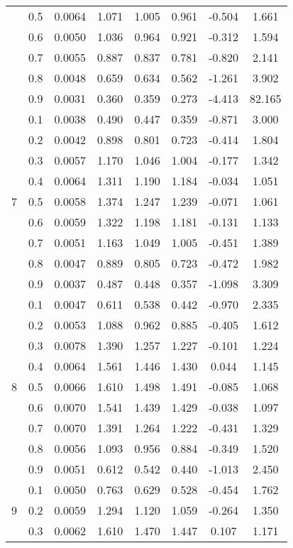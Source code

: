 \documentclass[11pt,a4paper]{report}
\begin{document}
\begin{longtable}{ | c | c || c | c | c | c | c | c | }
 & 0.5 & 0.0064 & 1.071 & 1.005 & 0.961 & -0.504 & 1.661 \\
 & 0.6 & 0.0050 & 1.036 & 0.964 & 0.921 & -0.312 & 1.594 \\
 & 0.7 & 0.0055 & 0.887 & 0.837 & 0.781 & -0.820 & 2.141 \\
 & 0.8 & 0.0048 & 0.659 & 0.634 & 0.562 & -1.261 & 3.902 \\
 & 0.9 & 0.0031 & 0.360 & 0.359 & 0.273 & -4.413 & 82.165 \\
 \hline
\multirow{9}{*}{7} & 0.1 & 0.0038 & 0.490 & 0.447 & 0.359 & -0.871 & 3.000 \\
 & 0.2 & 0.0042 & 0.898 & 0.801 & 0.723 & -0.414 & 1.804 \\
 & 0.3 & 0.0057 & 1.170 & 1.046 & 1.004 & -0.177 & 1.342 \\
 & 0.4 & 0.0064 & 1.311 & 1.190 & 1.184 & -0.034 & 1.051 \\
 & 0.5 & 0.0058 & 1.374 & 1.247 & 1.239 & -0.071 & 1.061 \\
 & 0.6 & 0.0059 & 1.322 & 1.198 & 1.181 & -0.131 & 1.133 \\
 & 0.7 & 0.0051 & 1.163 & 1.049 & 1.005 & -0.451 & 1.389 \\
 & 0.8 & 0.0047 & 0.889 & 0.805 & 0.723 & -0.472 & 1.982 \\
 & 0.9 & 0.0037 & 0.487 & 0.448 & 0.357 & -1.098 & 3.309 \\
 \hline
\multirow{9}{*}{8} & 0.1 & 0.0047 & 0.611 & 0.538 & 0.442 & -0.970 & 2.335 \\
 & 0.2 & 0.0053 & 1.088 & 0.962 & 0.885 & -0.405 & 1.612 \\
 & 0.3 & 0.0078 & 1.390 & 1.257 & 1.227 & -0.101 & 1.224 \\
 & 0.4 & 0.0064 & 1.561 & 1.446 & 1.430 & 0.044 & 1.145 \\
 & 0.5 & 0.0066 & 1.610 & 1.498 & 1.491 & -0.085 & 1.068 \\
 & 0.6 & 0.0070 & 1.541 & 1.439 & 1.429 & -0.038 & 1.097 \\
 & 0.7 & 0.0070 & 1.391 & 1.264 & 1.222 & -0.431 & 1.329 \\
 & 0.8 & 0.0056 & 1.093 & 0.956 & 0.884 & -0.349 & 1.520 \\
 & 0.9 & 0.0051 & 0.612 & 0.542 & 0.440 & -1.013 & 2.450 \\
 \hline
\multirow{9}{*}{9} & 0.1 & 0.0050 & 0.763 & 0.629 & 0.528 & -0.454 & 1.762 \\
 & 0.2 & 0.0059 & 1.294 & 1.120 & 1.059 & -0.264 & 1.350 \\
 & 0.3 & 0.0062 & 1.610 & 1.470 & 1.447 & 0.107 & 1.171 \\

\end{longtable}
\end{document}

